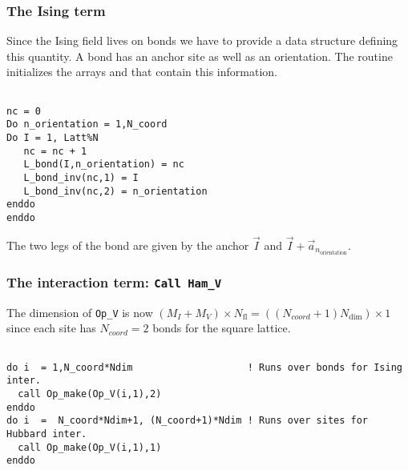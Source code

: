\documentclass{SciPost}
\begin{document}
\subsubsection{The Ising term}
%
Since the Ising field lives on bonds we have to provide a data structure defining this quantity.  A bond has an anchor site as well as an orientation. The routine    initializes  the arrays  and   that contain this information. 


\begin{lstlisting}

nc = 0
Do n_orientation = 1,N_coord
Do I = 1, Latt%N
   nc = nc + 1
   L_bond(I,n_orientation) = nc
   L_bond_inv(nc,1) = I    
   L_bond_inv(nc,2) = n_orientation
enddo
enddo
\end{lstlisting}
The two legs of the bond are given by  the anchor $\vec{I}$ and $\vec{I}+ \vec{a}_{n_\text{orientation}}$.
%
\subsubsection{The interaction term: \texttt{Call Ham\_V}}
%
The dimension of   \texttt{Op\_V}  is now  $(M_I + M_V)\times N_{\mathrm{fl}}=((N_{coord} +  1 )N_{\mathrm{dim}}) \times 1$ since each site has $N_{coord} =2$ bonds   for the square lattice.

\begin{lstlisting}

do i  = 1,N_coord*Ndim                    ! Runs over bonds for Ising inter.
  call Op_make(Op_V(i,1),2)
enddo
do i  =  N_coord*Ndim+1, (N_coord+1)*Ndim ! Runs over sites for Hubbard inter.
  call Op_make(Op_V(i,1),1)
enddo

\end{lstlisting}
\end{document}
